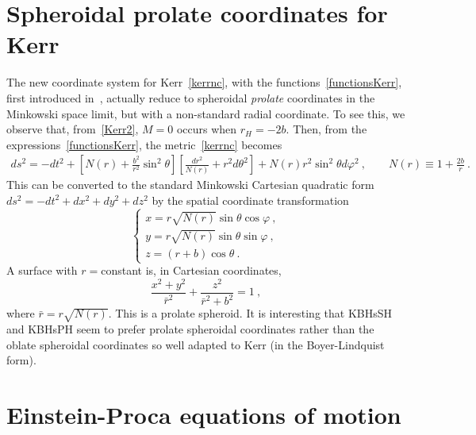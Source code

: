 \documentclass{article}
\numberwithin{equation}{section}
\begin{document}
 \bigskip
 
\appendix

\section{Spheroidal prolate coordinates for Kerr}
\label{prolatecoordinates}
The new coordinate system for Kerr~\eqref{kerrnc}, with the functions~\eqref{functionsKerr}, first introduced in~\cite{Herdeiro:2015gia}, actually reduce to spheroidal \textit{prolate} coordinates in the Minkowski space limit, but with a non-standard radial coordinate. To see this, we observe that, from~\eqref{Kerr2}, $M=0$ occurs when $r_H=-2b$. Then, from the expressions~\eqref{functionsKerr}, the metric~\eqref{kerrnc} becomes
\begin{eqnarray}
ds^2=-dt^2+\left[N(r)+\frac{b^2}{r^2}\sin^2\theta\right]\left[\frac{dr^2}{N(r)}+r^2d\theta^2\right]
+N(r)r^2\sin^2\theta d\varphi^2 \ , \qquad N(r)\equiv 1+\frac{2b}{r} \ .
\end{eqnarray}
This can be converted to the standard Minkowski Cartesian quadratic form $ds^2=-dt^2+dx^2+dy^2+dz^2$ by the spatial coordinate transformation
\begin{equation}
\left\{
\begin{array}{l}
x=r\sqrt{N(r)}\sin\theta\cos\varphi \ , \\
y=r\sqrt{N(r)}\sin\theta\sin\varphi \ , \\
z=(r+b)\cos\theta \ .
\end{array}
\right.
\end{equation}
A surface with $r=$constant is, in Cartesian coordinates,
\begin{equation}
\frac{x^2+y^2}{\bar{r}^2}+\frac{z^2}{\bar{r}^2+b^2}=1 \ ,
\end{equation}
where $\bar{r}=r\sqrt{N(r)}$. This is a prolate spheroid. It is interesting that KBHsSH and KBHsPH seem to prefer prolate spheroidal coordinates rather than the oblate spheroidal coordinates so well adapted to Kerr (in the Boyer-Lindquist form).





\section{Einstein-Proca equations of motion}
\label{appendixb}
\end{document}
